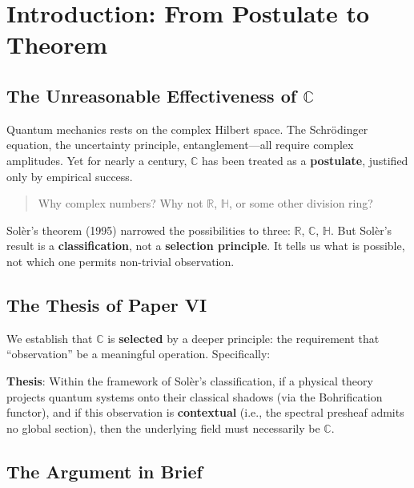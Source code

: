\documentclass[11pt]{article}
\begin{document}
\section{Introduction: From Postulate to Theorem}
\label{introduction-from-postulate-to-theorem}

\subsection{The Unreasonable Effectiveness of $\mathbb{C}$}
\label{the-unreasonable-effectiveness-of-c}

Quantum mechanics rests on the complex Hilbert space. The Schr\"{o}dinger equation, the uncertainty principle, entanglement---all require complex amplitudes. Yet for nearly a century, $\mathbb{C}$ has been treated as a \textbf{postulate}, justified only by empirical success.

\begin{quote}
Why complex numbers? Why not $\mathbb{R}$, $\mathbb{H}$, or some other division ring?
\end{quote}

Sol\`{e}r's theorem (1995) narrowed the possibilities to three: $\mathbb{R}$, $\mathbb{C}$, $\mathbb{H}$. But Sol\`{e}r's result is a \textbf{classification}, not a \textbf{selection principle}. It tells us what is possible, not which one permits non-trivial observation.

\subsection{The Thesis of Paper VI}
\label{the-thesis-of-paper-vi}

We establish that $\mathbb{C}$ is \textbf{selected} by a deeper principle: the requirement that ``observation'' be a meaningful operation. Specifically:

\textbf{Thesis}: Within the framework of Sol\`{e}r's classification, if a physical theory projects quantum systems onto their classical shadows (via the Bohrification functor), and if this observation is \textbf{contextual} (i.e., the spectral presheaf admits no global section), then the underlying field must necessarily be $\mathbb{C}$.

\subsection{The Argument in Brief}
\label{the-argument-in-brief}
\end{document}
